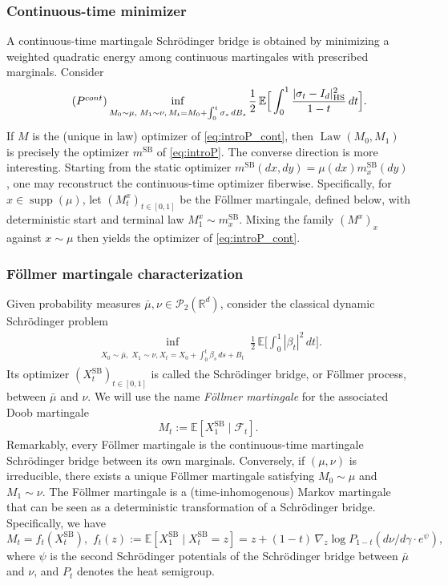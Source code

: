 \documentclass[reqno, a4paper]{amsart}
\newcommand{\msb}{m^{\text{SB}}}
\newcommand{\Xsb}{X^{\text{SB}}}
\theoremstyle{plain}
\theoremstyle{definition}
\theoremstyle{remark}
\numberwithin{equation}{section}
\numberwithin{theorem}{section}
\newcommand{\R}{\mathbb{R}}
\newcommand{\supp}{\operatorname{supp}}
\newcommand{\E}{\mathbb{E}}
\newcommand{\Law}{\operatorname{Law}}
\newcommand{\PP}{\mathcal{P}}
\begin{document}
	\subsubsection{Continuous-time minimizer}
	
	A continuous-time martingale Schr\"odinger bridge is obtained by minimizing a weighted quadratic energy among continuous martingales with prescribed marginals.
	Consider
	\begin{align}\label{eq:introP_cont}\tag{$P^{cont}$}
		\inf_{\substack{M_0\sim\mu,\;M_1\sim\nu,\, M_t=M_0+\int_0^t \sigma_s\,dB_s}}
		\frac12\,\E\Big[\int_0^1 \frac{|\sigma_t-I_d|_{\text{HS}}^2}{1-t}\,dt\Big].
	\end{align}
	If \(M\) is the (unique in law) optimizer of \eqref{eq:introP_cont}, then \(\Law(M_0,M_1)\) is precisely the optimizer \(\msb\) of \eqref{eq:introP}. 
	The converse direction is more interesting.
	Starting from the static optimizer \(\msb(dx,dy)=\mu(dx)\msb_x(dy)\), one may reconstruct the continuous-time optimizer fiberwise.
	Specifically, for \(x\in\supp(\mu)\), let \((M_t^x)_{t\in[0,1]}\) be the F\"ollmer martingale, defined below, with deterministic start and terminal law \(M_1^x\sim \msb_x\).
	Mixing the family \((M^x)_x\) against \(x\sim\mu\) then yields the optimizer of \eqref{eq:introP_cont}.
	
	\subsubsection{F\"ollmer martingale characterization}
	
	Given probability measures \(\bar\mu,\nu\in\PP_2(\R^d)\), consider the classical dynamic Schr\"odinger problem
	\begin{align}\label{eq:ContSchr}
		\inf_{\substack{X_0\sim \bar\mu,\;X_1\sim \nu, X_t=X_0+\int_0^t \beta_s\,ds+B_t}}
		\frac12\,\E\Big[\int_0^1 |\beta_t|^2\,dt\Big].
	\end{align}
	Its optimizer \((\Xsb_t)_{t\in[0,1]}\) is called the Schrödinger bridge, or Föllmer process, between \(\bar\mu\) and \(\nu\).
	We will use the name \emph{Föllmer martingale} for the associated Doob martingale
	\[
	M_t:=\E[\Xsb_1\mid \mathcal F_t].
	\] 
	Remarkably, every F\"ollmer martingale is the continuous-time martingale Schr\"odinger bridge between its own marginals.
	Conversely, if \((\mu,\nu)\) is irreducible, there exists a unique Föllmer martingale satisfying \(M_0\sim \mu\) and \(M_1\sim \nu\).
	The Föllmer martingale is a (time-inhomogenous) Markov martingale that can be seen as a deterministic transformation of a Schrödinger bridge.
	Specifically, we have
	\[
	M_t=f_t(\Xsb_t),
	\,\,
	f_t(z):=\E[\Xsb_1\mid \Xsb_t=z]
	= z+(1-t)\,\nabla_z\log P_{1-t}(d\nu/d\gamma\cdot e^\psi) ,
	\]
	where \( \psi \) is the second Schr\"odinger potentials of the Schrödinger bridge between $\bar \mu$ and $\nu$, and \(P_t\) denotes the heat semigroup.
	
\end{document}
